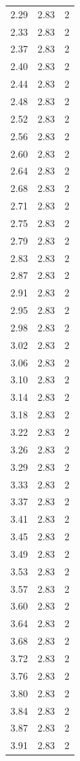\begin{longtable}{lrr}
  2.29 & 2.83 & 2 \\
  2.33 & 2.83 & 2 \\
  2.37 & 2.83 & 2 \\
  2.40 & 2.83 & 2 \\
  2.44 & 2.83 & 2 \\
  2.48 & 2.83 & 2 \\
  2.52 & 2.83 & 2 \\
  2.56 & 2.83 & 2 \\
  2.60 & 2.83 & 2 \\
  2.64 & 2.83 & 2 \\
  2.68 & 2.83 & 2 \\
  2.71 & 2.83 & 2 \\
  2.75 & 2.83 & 2 \\
  2.79 & 2.83 & 2 \\
  2.83 & 2.83 & 2 \\
  2.87 & 2.83 & 2 \\
  2.91 & 2.83 & 2 \\
  2.95 & 2.83 & 2 \\
  2.98 & 2.83 & 2 \\
  3.02 & 2.83 & 2 \\
  3.06 & 2.83 & 2 \\
  3.10 & 2.83 & 2 \\
  3.14 & 2.83 & 2 \\
  3.18 & 2.83 & 2 \\
  3.22 & 2.83 & 2 \\
  3.26 & 2.83 & 2 \\
  3.29 & 2.83 & 2 \\
  3.33 & 2.83 & 2 \\
  3.37 & 2.83 & 2 \\
  3.41 & 2.83 & 2 \\
  3.45 & 2.83 & 2 \\
  3.49 & 2.83 & 2 \\
  3.53 & 2.83 & 2 \\
  3.57 & 2.83 & 2 \\
  3.60 & 2.83 & 2 \\
  3.64 & 2.83 & 2 \\
  3.68 & 2.83 & 2 \\
  3.72 & 2.83 & 2 \\
  3.76 & 2.83 & 2 \\
  3.80 & 2.83 & 2 \\
  3.84 & 2.83 & 2 \\
  3.87 & 2.83 & 2 \\
  3.91 & 2.83 & 2 \\

\end{longtable}

